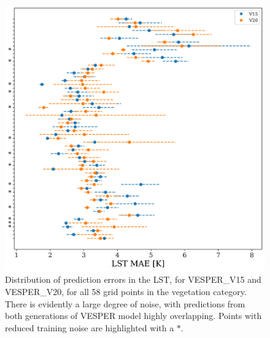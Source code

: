 \documentclass[hess, twostagejnl]{copernicus}
\providecommand{\DIFadd}[1]{{\protect\color{blue} \sf #1}} %
\providecommand{\DIFaddbegin}{} %
\providecommand{\DIFaddFL}[1]{\DIFadd{#1}} %
\begin{document}
\DIFaddbegin \begin{figure}
	\includegraphics[width=\columnwidth]{veg_plot_noise}
	\caption{\DIFaddFL{Distribution of prediction errors in the LST, for VESPER\_V15 and VESPER\_V20, for all 58 grid points in the vegetation category. There is evidently a large degree of noise, with predictions from both generations of VESPER model highly overlapping. Points with reduced training noise are highlighted with a $*$.}}
	\label{fig:veg-noise}
\end{figure}
\end{document}
